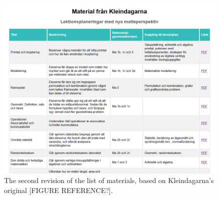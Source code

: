 \begin{figure}[H]
\centering
\includegraphics[width=\linewidth]{figure/screenshot_materiallista_revision_2.png}
\caption{The second revision of the list of materials, based on Kleindagarna's original [FIGURE REFERENCE?].}
\end{figure}

